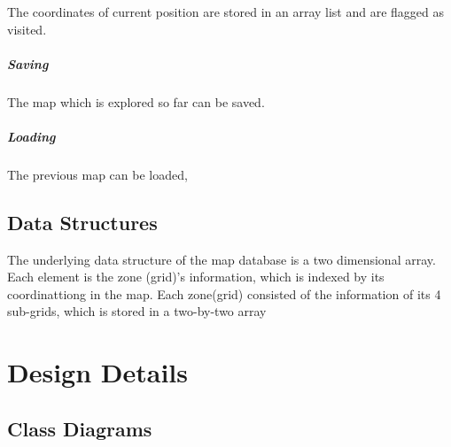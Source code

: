 \documentclass[11pt, a4paper]{report}
\begin{document}
The coordinates of current position are stored in an array list and are flagged as visited.

\paragraph{Saving}

The map which is explored so far can be saved.

\paragraph{Loading}

The previous map can be loaded,



\section{Data Structures}
The underlying data structure of the map database is a two dimensional array. Each element
is the zone (grid)'s information, which is indexed by its coordinattiong in the map. Each zone(grid)
consisted of the information of its 4 sub-grids, which is stored in a two-by-two array


\pagebreak

\chapter{Design Details}%
\label{cha:DD2}


\section{Class Diagrams}
\end{document}
